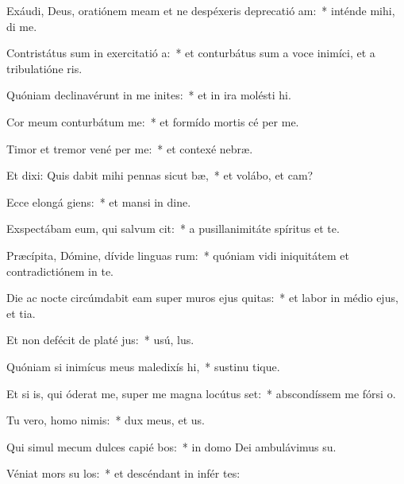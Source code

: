 \item Exáudi, Deus, oratiónem meam et ne despéxeris deprecatió am:~* inténde mihi,  di me.
\item Contristátus sum in exercitatió a:~* et conturbátus sum a voce inimíci, et a tribulatióne ris.
\item Quóniam declinavérunt in me inites:~* et in ira molésti  hi.
\item Cor meum conturbátum   me:~* et formído mortis cé per me.
\item Timor et tremor vené per me:~* et contexé  nebræ.
\item Et dixi: Quis dabit mihi pennas sicut bæ,~* et volábo, et cam?
\item Ecce elongá giens:~* et mansi in dine.
\item Exspectábam eum, qui salvum  cit:~* a pusillanimitáte spíritus et te.
\item Præcípita, Dómine, dívide linguas rum:~* quóniam vidi iniquitátem et contradictiónem in te.
\item Die ac nocte circúmdabit eam super muros ejus quitas:~* et labor in médio ejus, et tia.
\item Et non defécit de platé jus:~* usú,  lus.
\item Quóniam si inimícus meus maledixís hi,~* sustinu tique.
\item Et si is, qui óderat me, super me magna locútus set:~* abscondíssem me fórsi  o.
\item Tu vero, homo nimis:~* dux meus, et  us.
\item Qui simul mecum dulces capié bos:~* in domo Dei ambulávimus  su.
\item Véniat mors su los:~* et descéndant in infér tes:

